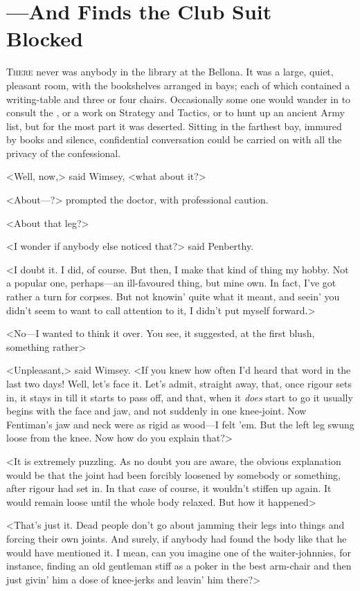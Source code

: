 \chapter{—And Finds the Club Suit Blocked}
\lettrine{T}{here} never was anybody in the library at the Bellona. It was a large, quiet, pleasant room, with the bookshelves arranged in bays; each of which contained a writing-table and three or four chairs. Occasionally some one would wander in to consult the , or a work on Strategy and Tactics, or to hunt up an ancient Army list, but for the most part it was deserted. Sitting in the farthest bay, immured by books and silence, confidential conversation could be carried on with all the privacy of the confessional.

<Well, now,> said Wimsey, <what about it?>

<About—?> prompted the doctor, with professional caution.

<About that leg?>

<I wonder if anybody else noticed that?> said Penberthy.

<I doubt it. I did, of course. But then, I make that kind of thing my hobby. Not a popular one, perhaps—an ill-favoured thing, but mine own. In fact, I've got rather a turn for corpses. But not knowin' quite what it meant, and seein' you didn't seem to want to call attention to it, I didn't put myself forward.>

<No—I wanted to think it over. You see, it suggested, at the first blush, something rather\longdash>

<Unpleasant,> said Wimsey. <If you knew how often I'd heard that word in the last two days! Well, let's face it. Let's admit, straight away, that, once rigour sets in, it stays in till it starts to pass off, and that, when it \emph{does} start to go it usually begins with the face and jaw, and not suddenly in one knee-joint. Now Fentiman's jaw and neck were as rigid as wood—I felt 'em. But the left leg swung loose from the knee. Now how do you explain that?>

<It is extremely puzzling. As no doubt you are aware, the obvious explanation would be that the joint had been forcibly loosened by somebody or something, after rigour had set in. In that case of course, it wouldn't stiffen up again. It would remain loose until the whole body relaxed. But how it happened\longdash>

<That's just it. Dead people don't go about jamming their legs into things and forcing their own joints. And surely, if anybody had found the body like that he would have mentioned it. I mean, can you imagine one of the waiter-johnnies, for instance, finding an old gentleman stiff as a poker in the best arm-chair and then just givin' him a dose of knee-jerks and leavin' him there?>

